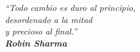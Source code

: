 \null
\vfill

\begin{center}
	\large\itshape
	``Todo cambio es duro al principio,\\[6pt]
	desordenado a la mitad\\[6pt]
	y precioso al final.''\\[24pt]
	\normalsize\upshape
	\textbf{Robin Sharma}\\[6pt]
\end{center}

\vfill
\null